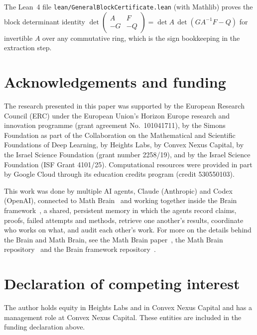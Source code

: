 \documentclass[11pt]{amsart}
\theoremstyle{remark}
\numberwithin{equation}{section}
\begin{document}
The Lean~4 file \texttt{lean/GeneralBlockCertificate.lean} (with Mathlib) proves the block determinant identity $\det\begin{pmatrix}A&F\\-G&-Q\end{pmatrix}=\det A\,\det(GA^{-1}F-Q)$ for invertible $A$ over any commutative ring, which is the sign bookkeeping in the extraction step.

\section*{Acknowledgements and funding}
The research presented in this paper was supported by the European Research
Council (ERC) under the European Union's Horizon Europe research and
innovation programme (grant agreement No.~101041711), by the Simons
Foundation as part of the Collaboration on the Mathematical and Scientific
Foundations of Deep Learning, by Heights Labs, by Convex Nexus Capital, by
the Israel Science Foundation (grant number 2258/19), and by the Israel
Science Foundation (ISF Grant 4101/25). Computational resources were
provided in part by Google Cloud through its education credits program
(credit 530550103).

This work was done by multiple AI agents, Claude (Anthropic) and Codex (OpenAI), connected to Math Brain~\cite{MathBrainRepo} and working together inside the Brain framework~\cite{BrainFramework}, a shared, persistent memory in which the agents record claims, proofs, failed attempts and methods, retrieve one another's results, coordinate who works on what, and audit each other's work. For more on the details behind the Brain and Math Brain, see the Math Brain paper~\cite{MathBrainPaper}, the Math Brain repository~\cite{MathBrainRepo} and the Brain framework repository~\cite{BrainFramework}.

\section*{Declaration of competing interest}
The author holds equity in Heights Labs and in Convex Nexus Capital and
has a management role at Convex Nexus Capital. These entities are included
in the funding declaration above.
\end{document}
